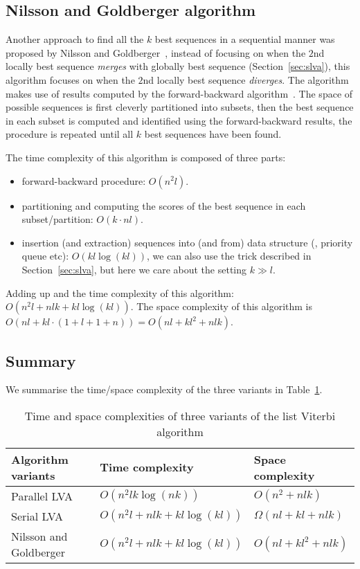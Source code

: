 \subsection{Nilsson and Goldberger algorithm}
\label{sec:nglva}

Another approach to find all the $k$ best sequences in a sequential manner was proposed by Nilsson and Goldberger~\cite{nilsson2001sequentially},
instead of focusing on when the $2$nd locally best sequence \textit{merges} with globally best sequence (Section~\ref{sec:slva}),
this algorithm focuses on when the $2$nd locally best sequence \textit{diverges}.
The algorithm makes use of results computed by the forward-backward algorithm~\cite{rabiner1989tutorial}.
The space of possible sequences is first cleverly partitioned into subsets, 
then the best sequence in each subset is computed and identified using the forward-backward results,
the procedure is repeated until all $k$ best sequences have been found.

The time complexity of this algorithm is composed of three parts:
\begin{itemize}
\item forward-backward procedure: $O(n^2 l)$.
\item partitioning and computing the scores of the best sequence in each subset/partition: $O(k \cdot nl)$.
\item insertion (and extraction) sequences into (and from) data structure (\eg, priority queue etc): $O(kl \log (kl))$,
      we can also use the trick described in Section~\ref{sec:slva}, but here we care about the setting $k \gg l$.
\end{itemize}
Adding up and the time complexity of this algorithm: $O \left( n^2 l + nlk + kl\log(kl) \right)$.
The space complexity of this algorithm is $O (nl + kl \cdot (1 + l + 1 + n) ) = O(nl + kl^2 + nlk)$.


\subsection{Summary}
We summarise the time/space complexity of the three variants in Table~\ref{tab:variants}.

\begin{table}[ht]
\caption{Time and space complexities of three variants of the list Viterbi algorithm}
\label{tab:variants}
\centering
\begin{tabular}{|l|l|l|} \hline
\textbf{Algorithm variants}  & \textbf{Time complexity} & \textbf{Space complexity} \\ \hline
Parallel LVA~\cite{seshadri1994list} & $O \left( n^2 lk \log(nk) \right)$ & $O \left( n^2 + nlk \right)$ \\ \hline
Serial LVA~\cite{seshadri1994list}   & $O \left( n^2 l + nlk + kl\log(kl) \right)$ & $\Omega(nl + kl + nlk)$ \\ \hline
Nilsson and Goldberger~\cite{nilsson2001sequentially} & $O \left( n^2 l + nlk + kl\log(kl) \right)$ & $O(nl + kl^2 + nlk)$ \\ \hline
\end{tabular}
\end{table}
